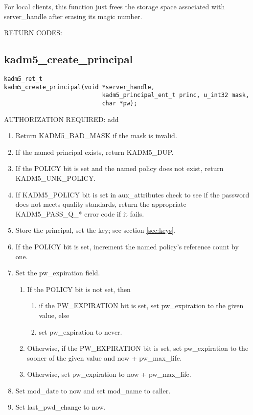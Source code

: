 For local clients, this function just frees the storage space
associated with server_handle after erasing its magic number.

RETURN CODES:

\subsection{kadm5_create_principal}

\begin{verbatim}
kadm5_ret_t
kadm5_create_principal(void *server_handle,
                            kadm5_principal_ent_t princ, u_int32 mask,
                            char *pw);
\end{verbatim}

AUTHORIZATION REQUIRED: add

\begin{enumerate}

\item Return KADM5_BAD_MASK if the mask is invalid.
\item If the named principal exists, return KADM5_DUP.
\item If the POLICY bit is set and the named policy does not exist,
return KADM5_UNK_POLICY.
\item If KADM5_POLICY bit is set in aux_attributes check to see if
the password does not meets quality standards, return the appropriate
KADM5_PASS_Q_* error code if it fails.
\item Store the principal, set the key; see section \ref{sec:keys}.
\item If the POLICY bit is set, increment the named policy's reference
count by one.

\item Set the pw_expiration field.
\begin{enumerate}
\item If the POLICY bit is not set, then
\begin{enumerate}
\item if the PW_EXPIRATION bit is set, set pw_expiration to the given
value, else
\item set pw_expiration to never.
\end{enumerate}
\item Otherwise, if the PW_EXPIRATION bit is set, set pw_expiration to
the sooner of the given value and now + pw_max_life.
\item Otherwise, set pw_expiration to now + pw_max_life.
\end{enumerate}

\item Set mod_date to now and set mod_name to caller.
\item Set last_pwd_change to now.
\end{enumerate}

